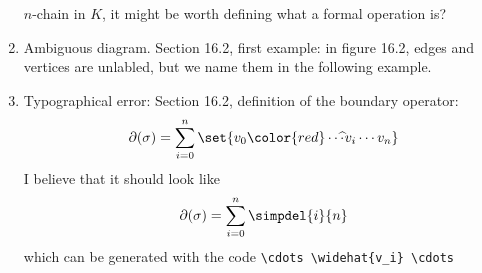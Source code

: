 \documentclass{fkletter}
\begin{document}
\begin{enumerate}
    $n$-chain in $K$, it might be worth defining what a formal operation is?
  \item Ambiguous diagram. Section 16.2, first example: in figure 16.2, edges
    and vertices are unlabled, but we name them in the following example.
  \item Typographical error: Section 16.2, definition of the boundary operator:
    \[
      \partial(\sigma) = \sum_{i=0}^n \set{v_0 {\color{red}\cdots\hspace{-.16cm}
          \widehat{\ } v_i} \cdots v_n}
    \]
    I believe that it should look like
    \[
      \partial(\sigma) = \sum_{i=0}^n \simpdel{i}{n}
    \]
    which can be generated with the code \verb|\cdots \widehat{v_i} \cdots|


\end{enumerate}
\end{document}
